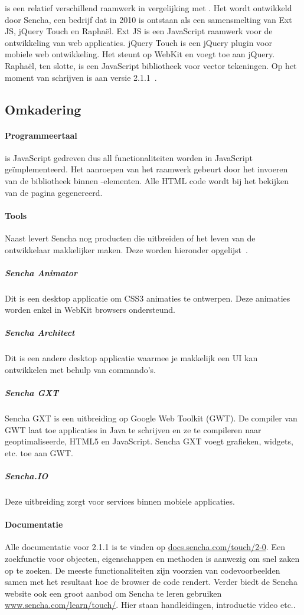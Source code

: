 \st{} is een relatief verschillend raamwerk in vergelijking met \jqm{}.  
Het wordt ontwikkeld door Sencha,  een bedrijf dat in 2010 is ontstaan als een samensmelting van Ext JS,  jQuery Touch en Raphaël.  
Ext JS is een JavaScript raamwerk voor de ontwikkeling van web applicaties. 
jQuery Touch is een jQuery plugin voor mobiele web ontwikkeling.  
Het steunt op WebKit en voegt  toe aan jQuery.  
Raphaël,  ten slotte,  is een JavaScript bibliotheek voor vector tekeningen. 
Op het moment van schrijven is \st{} aan versie 2.1.1~\cite{Inc.}.  

\subsection{Omkadering}
\paragraph{Programmeertaal}
\st{} is JavaScript gedreven dus all functionaliteiten worden in JavaScript geïmplementeerd. 
Het aanroepen van het raamwerk gebeurt door het invoeren van de \st{} bibliotheek binnen -elementen.  
Alle HTML code wordt bij het bekijken van de pagina gegenereerd.  

\paragraph{Tools}
Naast \st{} levert Sencha nog producten die \st{} uitbreiden of het leven van de ontwikkelaar makkelijker maken.  
Deze worden hieronder opgelijst~\cite{Inc.}.  

\subparagraph{Sencha Animator}
Dit is een desktop applicatie om CSS3 animaties te ontwerpen.  
Deze animaties worden enkel in WebKit browsers ondersteund.

\subparagraph{Sencha Architect}
Dit is een andere desktop applicatie waarmee je makkelijk een UI kan ontwikkelen met behulp van  commando's.  

\subparagraph{Sencha GXT}
Sencha GXT is een uitbreiding op Google Web Toolkit (GWT).  
De compiler van GWT laat toe applicaties in Java te schrijven en ze te compileren naar geoptimaliseerde,   HTML5 en JavaScript.  Sencha GXT voegt grafieken,  widgets, etc. toe aan GWT.

\subparagraph{Sencha.IO}
Deze uitbreiding zorgt voor  services binnen mobiele applicaties.  

\paragraph{Documentatie}
Alle documentatie voor \st{} 2.1.1 is te vinden op \url{docs.sencha.com/touch/2-0}.  
Een zoekfunctie voor objecten,  eigenschappen en methoden is aanwezig om snel zaken op te zoeken.  
De meeste functionaliteiten zijn voorzien van codevoorbeelden samen met het resultaat hoe de browser de code rendert.  
Verder biedt de Sencha website ook een groot aanbod om Sencha te leren gebruiken \url{www.sencha.com/learn/touch/}.  
Hier staan handleidingen,  introductie video etc..

